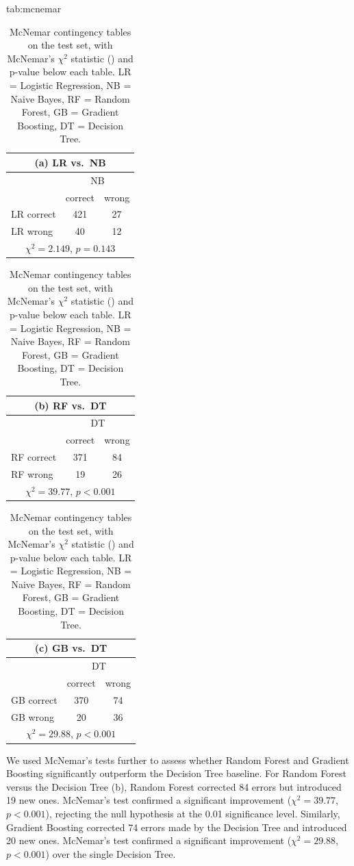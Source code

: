 \documentclass[pmlr]{jmlr}%
\begin{document}
\begin{table}[H]
\floatconts
  {tab:mcnemar}%
  {\caption{McNemar contingency tables on the test set, with McNemar's $\chi^2$ statistic () and p-value below each table. LR = Logistic Regression, NB = Naive Bayes, RF = Random Forest, GB = Gradient Boosting, DT = Decision Tree.}}%
  {\small\setlength{\tabcolsep}{3pt}%
  \begin{tabular}{lcc}
  \multicolumn{3}{c}{\bfseries (a) LR vs.\ NB}\\
  \toprule
  & \multicolumn{2}{c}{NB}\\
  & correct & wrong\\
  \midrule
  LR correct & 421 & 27\\
  LR wrong & 40 & 12\\
  \bottomrule
  \multicolumn{3}{c}{$\chi^2 = 2.149$, $p = 0.143$}
  \end{tabular}\hfill
  \begin{tabular}{lcc}
  \multicolumn{3}{c}{\bfseries (b) RF vs.\ DT}\\
  \toprule
  & \multicolumn{2}{c}{DT}\\
  & correct & wrong\\
  \midrule
  RF correct & 371 & 84\\
  RF wrong & 19 & 26\\
  \bottomrule
  \multicolumn{3}{c}{$\chi^2 = 39.77$, $p < 0.001$}
  \end{tabular}\hfill
  \begin{tabular}{lcc}
  \multicolumn{3}{c}{\bfseries (c) GB vs.\ DT}\\
  \toprule
  & \multicolumn{2}{c}{DT}\\
  & correct & wrong\\
  \midrule
  GB correct & 370 & 74\\
  GB wrong & 20 & 36\\
  \bottomrule
  \multicolumn{3}{c}{$\chi^2 = 29.88$, $p < 0.001$}
  \end{tabular}}
\end{table}

We used McNemar's tests further to assess whether Random Forest and Gradient Boosting significantly outperform the Decision Tree baseline. 
For Random Forest versus the Decision Tree (b), Random Forest corrected 84 errors but introduced 19 new ones. McNemar's test confirmed a significant improvement ($\chi^2 = 39.77$, $p < 0.001$), rejecting the null hypothesis at the 0.01 significance level.
Similarly, Gradient Boosting corrected 74 errors made by the Decision Tree and introduced 20 new ones. McNemar's test confirmed a significant improvement ($\chi^2 = 29.88$, $p < 0.001$) over the single Decision Tree.
\end{document}
